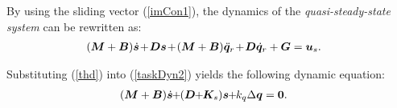 \documentclass[letterpaper, 10 pt, conference]{ieeeconf}
\begin{document}
By using the sliding vector (\ref{imCon1}), the dynamics of the {\em quasi-steady-state system}
can be rewritten as:
\begin{eqnarray}
&(\bm{M}+\bm B)\dot{\bm s}\hspace{-0.05cm}+\hspace{-0.05cm}\bm D\bm
s\hspace{-0.05cm}+\hspace{-0.05cm}(\bm{M}+\bm B)\ddot{\bm
q}_r\hspace{-0.05cm}+\hspace{-0.05cm}\bm D\dot{\bm
q}_r+\bm G=\bm u_s.\label{taskDyn2}
\end{eqnarray}
%

Substituting (\ref{thd}) into (\ref{taskDyn2})
yields the following dynamic equation:
\begin{eqnarray}
&(\bm{M}+\bm B)\dot{\bm
s}\hspace{-0.1cm}+\hspace{-0.1cm}(\bm D\hspace{-0.1cm}+\hspace{-0.1cm}\bm K_s)\bm
s\hspace{-0.1cm}+\hspace{-0.1cm}k_q\Delta\bm q=\bm
0.\label{robotclosed1}
\end{eqnarray}
\end{document}
